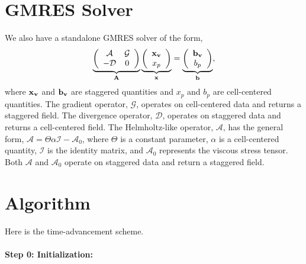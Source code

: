 \documentclass[final]{siamltex}
\def\Ab {{\bf A}}
\def\bb {{\bf b}}
\def\vb {{\bf v}}
\def\xb {{\bf x}}
\begin{document}
\section{GMRES Solver}
We also have a standalone GMRES solver of the form,
\begin{equation}
\underbrace{
\left(\begin{array}{cc}
\mathcal{A} & \mathcal{G} \\
-\mathcal{D} & 0
\end{array}\right)
}_{\Ab}
\underbrace{
\left(\begin{array}{c}
\xb_{\vb} \\
x_p
\end{array}\right)
}_{\xb}
=
\underbrace{
\left(\begin{array}{c}
\bb_{\vb}\\
b_p
\end{array}\right)}_{\bb},
\end{equation}
where $\xb_\vb$ and $\bb_\vb$ are staggered quantities and $x_p$ and $b_p$ are
cell-centered quantities.  The gradient operator, $\mathcal{G}$, operates on
cell-centered data and returns a staggered field.  The divergence operator, 
$\mathcal{D}$, operates on staggered data and returns a cell-centered field.  
The Helmholtz-like operator, $\mathcal{A}$, has the general form,
$\mathcal{A} = \Theta\alpha\mathcal{I} - \mathcal{A}_0$, where
$\Theta$ is a constant parameter,
$\alpha$ is a cell-centered quantity,
$\mathcal{I}$ is the identity matrix, 
and $\mathcal{A}_0$ represents the viscous stress tensor.
Both $\mathcal{A}$ and $\mathcal{A}_0$ operate on staggered data and return
a staggered field.\\

\section{Algorithm}
Here is the time-advancement scheme.\\ \\
{\bf Step 0: Initialization:}\\
\end{document}
